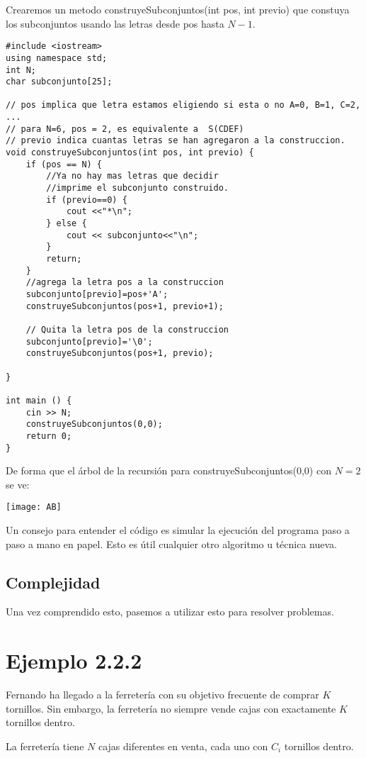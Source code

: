 Crearemos un metodo construyeSubconjuntos(int pos, int previo) que constuya los subconjuntos usando las letras desde pos hasta \(N-1\).
\pagebreak
\begin{lstlisting}
#include <iostream>
using namespace std;
int N;
char subconjunto[25];

// pos implica que letra estamos eligiendo si esta o no A=0, B=1, C=2, ...
// para N=6, pos = 2, es equivalente a  S(CDEF)
// previo indica cuantas letras se han agregaron a la construccion.
void construyeSubconjuntos(int pos, int previo) {
	if (pos == N) {
		//Ya no hay mas letras que decidir
		//imprime el subconjunto construido.
		if (previo==0) {
			cout <<"*\n";
		} else {
			cout << subconjunto<<"\n"; 
		}
		return;
	}
	//agrega la letra pos a la construccion
	subconjunto[previo]=pos+'A'; 
	construyeSubconjuntos(pos+1, previo+1); 
	
	// Quita la letra pos de la construccion
	subconjunto[previo]='\0'; 
	construyeSubconjuntos(pos+1, previo); 
	
}

int main () {
	cin >> N;
	construyeSubconjuntos(0,0);
	return 0;
}
\end{lstlisting}


De forma que el árbol de la recursión para construyeSubconjuntos(0,0) con \(N=2\) se ve:

\begin{center}
	\texttt{[image: AB]}
\end{center}

Un consejo para entender el código es simular la ejecución del programa paso a paso a mano en papel. Esto es útil cualquier otro algoritmo u técnica nueva.

\subsection*{Complejidad}
Una vez comprendido esto, pasemos a utilizar esto para resolver problemas.
\section*{Ejemplo 2.2.2}

Fernando ha llegado a la ferretería con su objetivo frecuente de comprar \(K\) tornillos.  Sin embargo, la ferretería no siempre vende cajas con exactamente \(K\) tornillos dentro.

La ferretería tiene \(N\) cajas diferentes en venta, cada uno con \(C_i\) tornillos dentro.

